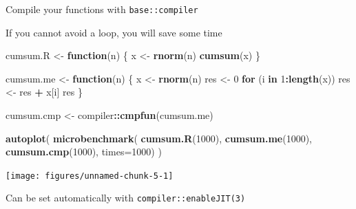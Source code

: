 \documentclass[10pt,ignorenonframetext,]{beamer}
\newenvironment{Shaded}{\begin{snugshade}}{\end{snugshade}}
\newcommand{\KeywordTok}[1]{\textcolor[rgb]{0.13,0.29,0.53}{\textbf{#1}}}
\newcommand{\DataTypeTok}[1]{\textcolor[rgb]{0.13,0.29,0.53}{#1}}
\newcommand{\DecValTok}[1]{\textcolor[rgb]{0.00,0.00,0.81}{#1}}
\newcommand{\StringTok}[1]{\textcolor[rgb]{0.31,0.60,0.02}{#1}}
\newcommand{\ControlFlowTok}[1]{\textcolor[rgb]{0.13,0.29,0.53}{\textbf{#1}}}
\newcommand{\OperatorTok}[1]{\textcolor[rgb]{0.81,0.36,0.00}{\textbf{#1}}}
\newcommand{\NormalTok}[1]{#1}
\begin{document}
\begin{frame}{Compile your functions with
\texttt{base::compiler}}

If you cannot avoid a loop, you will save some time

\scriptsize

\begin{Shaded}
\begin{Highlighting}[]
\NormalTok{cumsum.R <-}\StringTok{ }\ControlFlowTok{function}\NormalTok{(n) \{}
\NormalTok{  x <-}\StringTok{ }\KeywordTok{rnorm}\NormalTok{(n)}
  \KeywordTok{cumsum}\NormalTok{(x)}
\NormalTok{\}}

\NormalTok{cumsum.me <-}\StringTok{ }\ControlFlowTok{function}\NormalTok{(n) \{}
\NormalTok{  x <-}\StringTok{ }\KeywordTok{rnorm}\NormalTok{(n)}
\NormalTok{  res <-}\StringTok{ }\DecValTok{0}
  \ControlFlowTok{for}\NormalTok{ (i }\ControlFlowTok{in} \DecValTok{1}\OperatorTok{:}\KeywordTok{length}\NormalTok{(x)) }
\NormalTok{    res <-}\StringTok{ }\NormalTok{res }\OperatorTok{+}\StringTok{ }\NormalTok{x[i]}
\NormalTok{  res}
\NormalTok{\}}

\NormalTok{cumsum.cmp <-}\StringTok{ }\NormalTok{compiler}\OperatorTok{::}\KeywordTok{cmpfun}\NormalTok{(cumsum.me)}

\KeywordTok{autoplot}\NormalTok{(}
  \KeywordTok{microbenchmark}\NormalTok{(}
    \KeywordTok{cumsum.R}\NormalTok{(}\DecValTok{1000}\NormalTok{),}
    \KeywordTok{cumsum.me}\NormalTok{(}\DecValTok{1000}\NormalTok{),}
    \KeywordTok{cumsum.cmp}\NormalTok{(}\DecValTok{1000}\NormalTok{), }
    \DataTypeTok{times=}\DecValTok{1000}\NormalTok{)}
\NormalTok{)}
\end{Highlighting}
\end{Shaded}

\begin{center}\texttt{[image: figures/unnamed-chunk-5-1]} \end{center}

\normalsize

\rsa Can be set automatically with \texttt{compiler::enableJIT(3)}

\end{frame}
\end{document}
